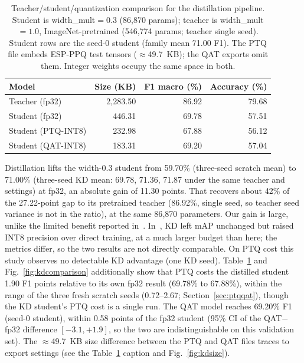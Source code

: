 \documentclass[conference]{IEEEtran}
\begin{document}
	\begin{table}[h]
		\caption{Teacher/student/quantization comparison for the distillation pipeline. Student is
			width\_mult$=0.3$ (86{,}870 params); teacher is width\_mult$=1.0$, ImageNet-pretrained
			(546{,}774 params; teacher single seed). Student rows are the seed-0 student (family mean 71.00 F1). The PTQ file embeds ESP-PPQ test tensors ($\approx$49.7~KB); the QAT exports omit them. Integer weights occupy the same space in both.}
		\label{tab:kdcomparison}
		\centering
		\begin{tabular}{lrrr}
			\toprule
			Model & Size (KB) & F1 macro (\%) & Accuracy (\%) \\
			\midrule
			Teacher (fp32) & 2{,}283.50 & 86.92 & 79.68 \\
			Student (fp32) & 446.31 & 69.78 & 57.51 \\
			Student (PTQ-INT8) & 232.98 & 67.88 & 56.12 \\
			Student (QAT-INT8) & 183.31 & 69.20 & 57.04 \\
			\bottomrule
		\end{tabular}
	\end{table}
	
	Distillation lifts the width-0.3 student from 59.70\% (three-seed scratch mean) to 71.00\% (three-seed KD mean: 69.78, 71.36, 71.87 under the same teacher and settings) at fp32, an
	absolute gain of 11.30 points. That recovers about 42\% of the 27.22-point gap to its pretrained teacher (86.92\%, single seed, so teacher seed variance is not in the ratio), at the same 86{,}870 parameters. Our gain is large, unlike the limited benefit reported in~\cite{chen2025animalreid}. In~\cite{karjol2026edgekd}, KD left mAP unchanged but raised INT8 precision over direct training, at a much larger budget than here; the metrics differ, so the two results are not directly comparable. On PTQ cost this study observes no detectable KD advantage (one KD seed). Table~\ref{tab:kdcomparison}
	and Fig.~\ref{fig:kdcomparison} additionally show that PTQ costs the distilled student 1.90 F1
	points relative to its own fp32 result (69.78\% to 67.88\%), within the range of the three fresh scratch seeds (0.72--2.67; Section~\ref{sec:ptqqat}), though the KD student's PTQ cost is a single run.
	The QAT model reaches 69.20\% F1 (seed-0 student), within 0.58 points of the fp32 student (95\% CI of the QAT$-$fp32 difference $[-3.1,+1.9]$, so
	the two are indistinguishable on this validation set). The $\approx$49.7~KB size difference between the PTQ
	and QAT files traces to export settings (see the Table~\ref{tab:kdcomparison} caption and Fig.~\ref{fig:kdsize}).
	
\end{document}
